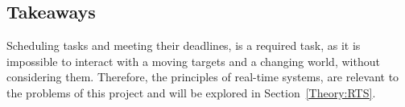 \subsection{Takeaways}
Scheduling tasks and meeting their deadlines, is a required task, as it is impossible to interact with a moving targets and a changing world, without considering them. 
Therefore, the principles of real-time systems, are relevant to the problems of this project and will be explored in Section~\ref{Theory:RTS}.

